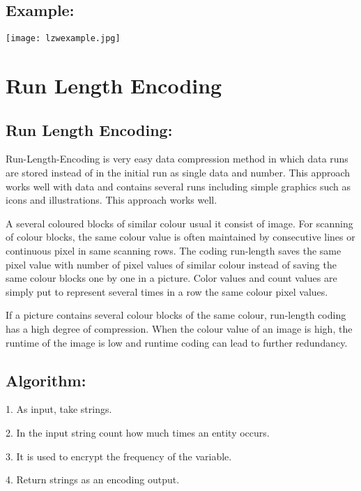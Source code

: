 \documentclass[a4paper, 12pt]{article}
\begin{document}
\subsection{Example:}
\texttt{[image: lzwexample.jpg]}
\vspace{5mm}


\newpage

\section{Run Length Encoding}
\subsection{Run Length Encoding:}
\par Run-Length-Encoding is very easy data compression method in which data 
runs are stored instead of in the initial run as single data and number. This 
approach works well with data and contains several runs including simple 
graphics such as icons and illustrations. This approach works well.
\\
\par A several coloured blocks of similar colour usual it 
consist of image. For scanning of colour blocks, the same colour value is 
often maintained by consecutive lines or continuous pixel in same scanning 
rows. The coding run-length saves the same pixel value with number of pixel
values of similar colour instead of saving the same colour blocks one by one 
in a picture. Color values and count values are simply put to represent 
several times in a row the same colour pixel values.
\\
\par If a picture contains several colour blocks of the 
same colour, run-length coding has a high degree of compression. When the 
colour value of an image is high, the runtime of the image is low and 
runtime coding can lead to further redundancy.
\\

\subsection{Algorithm:}
\par 1. As input, take strings. \\
\par 2. In the input string count how much times an entity occurs.\\
\par 3. It is used to encrypt the frequency of the variable.\\
\par 4. Return strings as an encoding output.
\\
\end{document}
